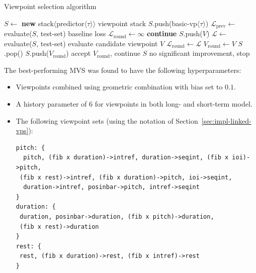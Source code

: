 \documentclass[12pt,a4paper,twoside,openright]{report}
\begin{document}
\begin{algorithm}[H]
  \caption{Viewpoint selection algorithm}
  \label{alg:vp-select}
  \begin{algorithmic}[1]
      \State $S \gets$ \textbf{new}
      stack$\langle$predictor$\langle\tau\rangle\rangle$ 
      \Comment viewpoint stack
      \State $S$.push(basic-vp$\langle\tau\rangle$)
      \State $\mathcal{L}_{\mathrm{prev}} \gets$ evaluate($S$, test-set)
      \Comment baseline loss
      \Loop
        \State $\mathcal{L}_{\mathrm{round}} \gets \infty$
           \textbf{continue}
          \EndIf
          \State $S$.push($V$)
          \State $\mathcal{L} \gets$ evaluate($S$, test-set) 
          \Comment evaluate candidate viewpoint $V$
            \State $\mathcal{L}_{\mathrm{round}} \gets \mathcal{L}$
            \State $V_{\mathrm{round}} \gets V$
          \EndIf
          \State $S$.pop()
        \EndFor
          \State $S$.push($V_{\mathrm{round}}$)
          \Comment accept $V_{\mathrm{round}}$, continue
        \Else
          \State \Return $S$
          \Comment no significant improvement, stop
        \EndIf
      \EndLoop
    \EndFunction
  \end{algorithmic}
\end{algorithm}

The best-performing MVS was found to have the following hyperparameters:
\begin{itemize}
  \item Viewpoints combined using geometric combination with bias set to $0.1$.
  \item A history parameter of $6$ for viewpoints in both long- and short-term model.
  \item The following viewpoint sets (using the notation of
    Section~\ref{sec:impl-linked-vps}):
\begin{verbatim}
pitch: { 
  pitch, (fib x duration)->intref, duration->seqint, (fib x ioi)->pitch,
 (fib x rest)->intref, (fib x duration)->pitch, ioi->seqint,
  duration->intref, posinbar->pitch, intref->seqint
}
duration: {
 duration, posinbar->duration, (fib x pitch)->duration,
 (fib x rest)->duration
}
rest: {
 rest, (fib x duration)->rest, (fib x intref)->rest
}
\end{verbatim}

\end{itemize}
\end{document}
